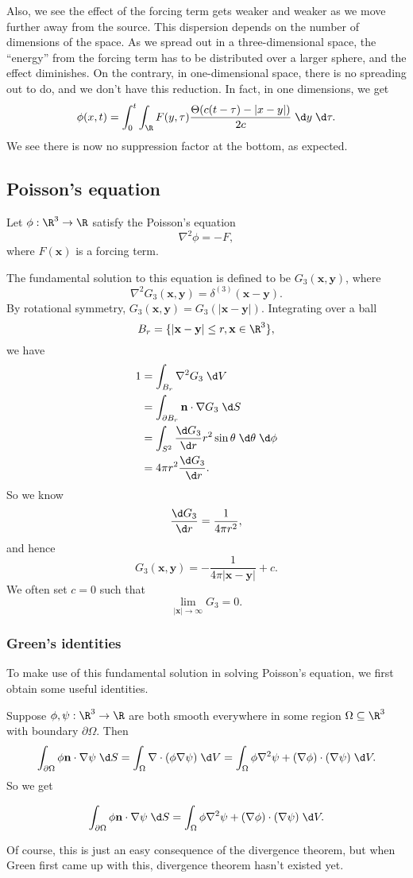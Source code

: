\documentclass[a4paper]{article}
\begin{document}
Also, we see the effect of the forcing term gets weaker and weaker as we move further away from the source. This dispersion depends on the number of dimensions of the space. As we spread out in a three-dimensional space, the ``energy'' from the forcing term has to be distributed over a larger sphere, and the effect diminishes. On the contrary, in one-dimensional space, there is no spreading out to do, and we don't have this reduction. In fact, in one dimensions, we get
\[
  \phi(x, t) = \int_0^t \int_\R F(y, \tau) \frac{\Theta(c(t - \tau) - |x - y|)}{2c} \;\d y \;\d \tau.
\]
We see there is now no suppression factor at the bottom, as expected.

\subsection{Poisson's equation}
Let $\phi: \R^3 \to \R$ satisfy the Poisson's equation
\[
  \nabla^2 \phi = -F,
\]
where $F(\mathbf{x})$ is a forcing term.

The fundamental solution to this equation is defined to be $G_3(\mathbf{x}, \mathbf{y})$, where
\[
  \nabla^2 G_3(\mathbf{x}, \mathbf{y}) = \delta^{(3)}(\mathbf{x} - \mathbf{y}).
\]
By rotational symmetry, $G_3(\mathbf{x}, \mathbf{y}) = G_3(|\mathbf{x} - \mathbf{y}|)$. Integrating over a ball
\[
  B_r = \{|\mathbf{x} - \mathbf{y}| \leq r, \mathbf{x} \in \R^3\},
\]
we have
\begin{align*}
  1 &= \int_{B_r} \nabla^2 G_3\;\d V \\
  &= \int_{\partial B_r} \mathbf{n}\cdot \nabla G_3 \;\d S\\
  &= \int_{S^2} \frac{\d G_3}{\d r} r^2 \sin \theta \;\d \theta \;\d \phi\\
  &= 4\pi r^2 \frac{\d G_3}{\;\d r}.
\end{align*}
So we know
\[
  \frac{\d G_3}{\d r} = \frac{1}{4\pi r^2},
\]
and hence
\[
  G_3(\mathbf{x}, \mathbf{y}) = -\frac{1}{4\pi |\mathbf{x} - \mathbf{y}|} + c.
\]
We often set $c = 0$ such that
\[
  \lim_{|\mathbf{x}| \to \infty} G_3 = 0.
\]
\subsubsection*{Green's identities}
To make use of this fundamental solution in solving Poisson's equation, we first obtain some useful identities.

Suppose $\phi, \psi: \R^3 \to \R$ are both smooth everywhere in some region $\Omega \subseteq \R^3$ with boundary $\partial \Omega$. Then
\[
  \int_{\partial \Omega} \phi\mathbf{n} \cdot \nabla \psi\;\d S = \int_\Omega \nabla\cdot (\phi \nabla \psi) \;\d V = \int_\Omega \phi \nabla^2 \psi + (\nabla \phi)\cdot (\nabla \psi)\;\d V.
\]
So we get
\begin{prop}
\[
  \int_{\partial \Omega} \phi\mathbf{n} \cdot \nabla \psi\;\d S = \int_\Omega \phi \nabla^2 \psi + (\nabla \phi)\cdot (\nabla \psi)\;\d V.
\]
\end{prop}
Of course, this is just an easy consequence of the divergence theorem, but when Green first came up with this, divergence theorem hasn't existed yet.
\end{document}
